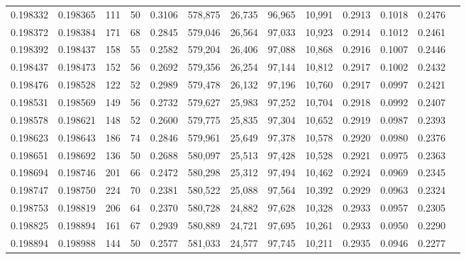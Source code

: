 \begin{tabular}{rrrrrrrrrrrrr}
0.198332 & 0.198365 &   111 &  50 &                                     0.3106 & 578,875 &  26,735 &  96,965 &  10,991 & 0.2913 & 0.1018 & 0.2476 \\
0.198372 & 0.198384 &   171 &  68 &                                     0.2845 & 579,046 &  26,564 &  97,033 &  10,923 & 0.2914 & 0.1012 & 0.2461 \\
0.198392 & 0.198437 &   158 &  55 &                                     0.2582 & 579,204 &  26,406 &  97,088 &  10,868 & 0.2916 & 0.1007 & 0.2446 \\
0.198437 & 0.198473 &   152 &  56 &                                     0.2692 & 579,356 &  26,254 &  97,144 &  10,812 & 0.2917 & 0.1002 & 0.2432 \\
0.198476 & 0.198528 &   122 &  52 &                                     0.2989 & 579,478 &  26,132 &  97,196 &  10,760 & 0.2917 & 0.0997 & 0.2421 \\
0.198531 & 0.198569 &   149 &  56 &                                     0.2732 & 579,627 &  25,983 &  97,252 &  10,704 & 0.2918 & 0.0992 & 0.2407 \\
0.198578 & 0.198621 &   148 &  52 &                                     0.2600 & 579,775 &  25,835 &  97,304 &  10,652 & 0.2919 & 0.0987 & 0.2393 \\
0.198623 & 0.198643 &   186 &  74 &                                     0.2846 & 579,961 &  25,649 &  97,378 &  10,578 & 0.2920 & 0.0980 & 0.2376 \\
0.198651 & 0.198692 &   136 &  50 &                                     0.2688 & 580,097 &  25,513 &  97,428 &  10,528 & 0.2921 & 0.0975 & 0.2363 \\
0.198694 & 0.198746 &   201 &  66 &                                     0.2472 & 580,298 &  25,312 &  97,494 &  10,462 & 0.2924 & 0.0969 & 0.2345 \\
0.198747 & 0.198750 &   224 &  70 &                                     0.2381 & 580,522 &  25,088 &  97,564 &  10,392 & 0.2929 & 0.0963 & 0.2324 \\
0.198753 & 0.198819 &   206 &  64 &                                     0.2370 & 580,728 &  24,882 &  97,628 &  10,328 & 0.2933 & 0.0957 & 0.2305 \\
0.198825 & 0.198894 &   161 &  67 &                                     0.2939 & 580,889 &  24,721 &  97,695 &  10,261 & 0.2933 & 0.0950 & 0.2290 \\
0.198894 & 0.198988 &   144 &  50 &                                     0.2577 & 581,033 &  24,577 &  97,745 &  10,211 & 0.2935 & 0.0946 & 0.2277 \\

\end{tabular}
